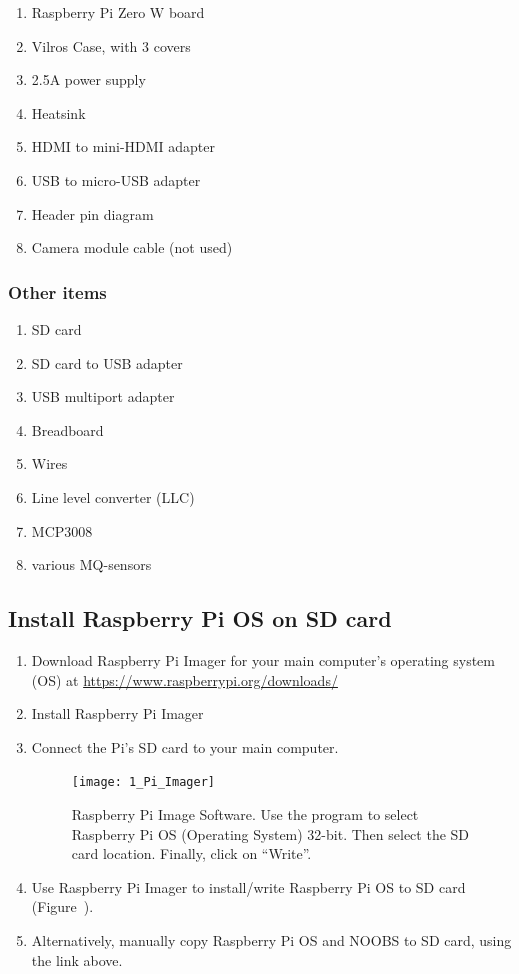 \documentclass{article}
\begin{document}
\begin{enumerate}[noitemsep]
  \item Raspberry Pi Zero W board
  \item Vilros Case, with 3 covers
  \item 2.5A power supply
  \item Heatsink
  \item HDMI to mini-HDMI adapter
  \item USB to micro-USB adapter
  \item Header pin diagram
  \item Camera module cable (not used)
\end{enumerate}

\subsubsection{Other items}

\begin{enumerate}[noitemsep]
  \item SD card
  \item SD card to USB adapter
  \item USB multiport adapter
  \item Breadboard
  \item Wires
  \item Line level converter (LLC)
  \item MCP3008
  \item various MQ-sensors

\end{enumerate}

\subsection{Install Raspberry Pi OS on SD card}

\begin{enumerate}
  \item Download Raspberry Pi Imager for your main computer's operating system (OS) at \url{https://www.raspberrypi.org/downloads/}
  \item Install Raspberry Pi Imager
  \item Connect the Pi's SD card to your main computer.
  
\begin{figure}
\centering
\texttt{[image: 1\_Pi\_Imager]}
\caption{Raspberry Pi Image Software. Use the program to select Raspberry Pi OS (Operating System) 32-bit. Then select the SD card location. Finally, click on ``Write''.}
\label{fig:pi_imager}
\end{figure}

  \item Use Raspberry Pi Imager to install/write Raspberry Pi OS to SD card (Figure~\label{fig:pi_imager}).
  \item Alternatively, manually copy Raspberry Pi OS and NOOBS to SD card, using the link above.
\end{enumerate}
\end{document}
